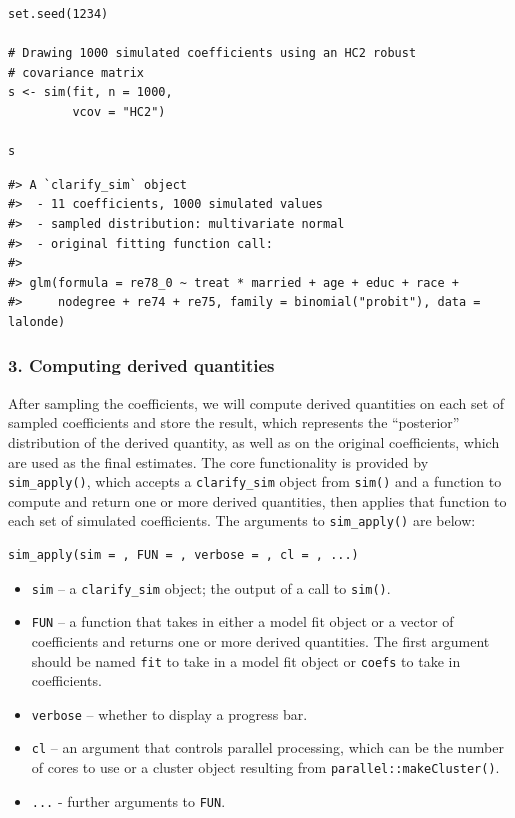 \begin{verbatim}
set.seed(1234)

# Drawing 1000 simulated coefficients using an HC2 robust
# covariance matrix
s <- sim(fit, n = 1000,
         vcov = "HC2")

s
\end{verbatim}

\begin{verbatim}
#> A `clarify_sim` object
#>  - 11 coefficients, 1000 simulated values
#>  - sampled distribution: multivariate normal
#>  - original fitting function call:
#> 
#> glm(formula = re78_0 ~ treat * married + age + educ + race + 
#>     nodegree + re74 + re75, family = binomial("probit"), data = lalonde)
\end{verbatim}

\hypertarget{computing-derived-quantities}{%
\subsubsection{3. Computing derived quantities}\label{computing-derived-quantities}}

After sampling the coefficients, we will compute derived quantities on each set of sampled coefficients and store the result, which represents the ``posterior'' distribution of the derived quantity, as well as on the original coefficients, which are used as the final estimates. The core functionality is provided by \texttt{sim\_apply()}, which accepts a \texttt{clarify\_sim} object from \texttt{sim()} and a function to compute and return one or more derived quantities, then applies that function to each set of simulated coefficients. The arguments to \texttt{sim\_apply()} are below:

\begin{verbatim}
sim_apply(sim = , FUN = , verbose = , cl = , ...)
\end{verbatim}

\begin{itemize}
\item
  \texttt{sim} -- a \texttt{clarify\_sim} object; the output of a call to \texttt{sim()}.
\item
  \texttt{FUN} -- a function that takes in either a model fit object or a vector of coefficients and returns one or more derived quantities. The first argument should be named \texttt{fit} to take in a model fit object or \texttt{coefs} to take in coefficients.
\item
  \texttt{verbose} -- whether to display a progress bar.
\item
  \texttt{cl} -- an argument that controls parallel processing, which can be the number of cores to use or a cluster object resulting from \texttt{parallel::makeCluster()}.
\item
  \texttt{...} - further arguments to \texttt{FUN}.
\end{itemize}

